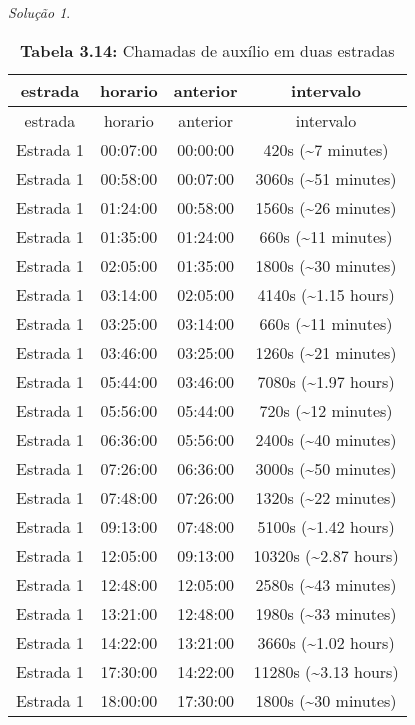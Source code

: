 \documentclass[
]{latex/krantz}
\theoremstyle{definition}
\theoremstyle{definition}
\theoremstyle{definition}
\theoremstyle{definition}
\theoremstyle{remark}
\newtheorem*{solution}{Solução}
\begin{document}
\begin{solution}
\begin{longtable}[]{@{}cccc@{}}
\caption{\textbf{Tabela 3.14:} Chamadas de auxílio em duas estradas}\tabularnewline
\toprule\noalign{}
estrada & horario & anterior & intervalo \\
\midrule\noalign{}
\endfirsthead
\toprule\noalign{}
estrada & horario & anterior & intervalo \\
\midrule\noalign{}
\endhead
\bottomrule\noalign{}
\endlastfoot
Estrada 1 & 00:07:00 & 00:00:00 & 420s (\textasciitilde7 minutes) \\
Estrada 1 & 00:58:00 & 00:07:00 & 3060s (\textasciitilde51 minutes) \\
Estrada 1 & 01:24:00 & 00:58:00 & 1560s (\textasciitilde26 minutes) \\
Estrada 1 & 01:35:00 & 01:24:00 & 660s (\textasciitilde11 minutes) \\
Estrada 1 & 02:05:00 & 01:35:00 & 1800s (\textasciitilde30 minutes) \\
Estrada 1 & 03:14:00 & 02:05:00 & 4140s (\textasciitilde1.15 hours) \\
Estrada 1 & 03:25:00 & 03:14:00 & 660s (\textasciitilde11 minutes) \\
Estrada 1 & 03:46:00 & 03:25:00 & 1260s (\textasciitilde21 minutes) \\
Estrada 1 & 05:44:00 & 03:46:00 & 7080s (\textasciitilde1.97 hours) \\
Estrada 1 & 05:56:00 & 05:44:00 & 720s (\textasciitilde12 minutes) \\
Estrada 1 & 06:36:00 & 05:56:00 & 2400s (\textasciitilde40 minutes) \\
Estrada 1 & 07:26:00 & 06:36:00 & 3000s (\textasciitilde50 minutes) \\
Estrada 1 & 07:48:00 & 07:26:00 & 1320s (\textasciitilde22 minutes) \\
Estrada 1 & 09:13:00 & 07:48:00 & 5100s (\textasciitilde1.42 hours) \\
Estrada 1 & 12:05:00 & 09:13:00 & 10320s (\textasciitilde2.87 hours) \\
Estrada 1 & 12:48:00 & 12:05:00 & 2580s (\textasciitilde43 minutes) \\
Estrada 1 & 13:21:00 & 12:48:00 & 1980s (\textasciitilde33 minutes) \\
Estrada 1 & 14:22:00 & 13:21:00 & 3660s (\textasciitilde1.02 hours) \\
Estrada 1 & 17:30:00 & 14:22:00 & 11280s (\textasciitilde3.13 hours) \\
Estrada 1 & 18:00:00 & 17:30:00 & 1800s (\textasciitilde30 minutes) \\

\end{longtable}
\end{solution}
\end{document}
